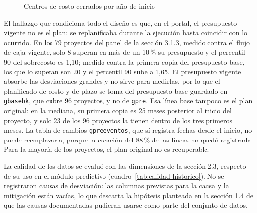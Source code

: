 \begin{figure}[H]
\centering
\caption{Centros de costo cerrados por año de inicio}\label{fig:proyectos-anio}
\end{figure}

El hallazgo que condiciona todo el diseño es que, en el portal, el presupuesto vigente no es el plan: se replanificaba durante la ejecución hasta coincidir con lo ocurrido. En los 79 proyectos del panel de la sección 3.1.3, medido contra el flujo de caja vigente, solo 8 superan en más de un 10\,\% su presupuesto y el percentil 90 del sobrecosto es 1,10; medido contra la primera copia del presupuesto base, los que lo superan son 20 y el percentil 90 sube a 1,65. El presupuesto vigente absorbe las desviaciones grandes y no sirve para medirlas, por lo que el planificado de costo y de plazo se toma del presupuesto base guardado en \texttt{gbasebk}, que cubre 96 proyectos, y no de \texttt{gpre}. Esa línea base tampoco es el plan original: en la mediana, su primera copia es 25 meses posterior al inicio del proyecto, y solo 23 de los 96 proyectos la tienen dentro de los tres primeros meses. La tabla de cambios \texttt{gpreeventos}, que sí registra fechas desde el inicio, no puede reemplazarla, porque la creación del 88\,\% de las líneas no quedó registrada. Para la mayoría de los proyectos, el plan original no es recuperable.

La calidad de los datos se evaluó con las dimensiones de la sección 2.3, respecto de su uso en el módulo predictivo (cuadro~\ref{tab:calidad-historico}). No se registraron causas de desviación: las columnas previstas para la causa y la mitigación están vacías, lo que descarta la hipótesis planteada en la sección 1.4 de que las causas documentadas pudieran usarse como parte del conjunto de datos.

